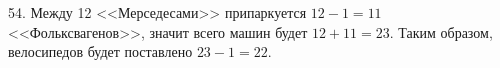 54. Между 12 <<Мерседесами>> припаркуется $12-1=11$ <<Фольксвагенов>>, значит всего машин будет $12+11=23.$ Таким образом, велосипедов будет поставлено $23-1=22.$\\
